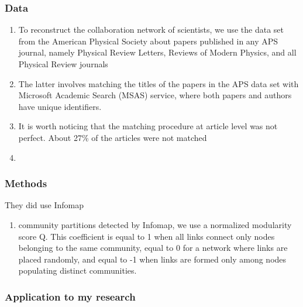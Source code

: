 \documentclass[12pt]{article}
\begin{document}
\subsubsection*{Data}

\begin{enumerate}
    \item To reconstruct the collaboration network of scientists, we use the data set from the American Physical Society about papers published in any APS journal, namely Physical Review Letters, Reviews of Modern Physics, and all Physical Review journals
    \item The latter involves matching the titles of the papers in the APS data set with Microsoft Academic Search (MSAS) service, where both papers and authors have unique identifiers.
    \item It is worth noticing that the matching procedure at article level was not perfect. About 27\% of the articles were not matched
    \item 
\end{enumerate}

\subsubsection*{Methods}

They did use Infomap

\begin{enumerate}
    \item community partitions detected by Infomap, we use a normalized modularity score Q. This coefficient is equal to 1 when all links connect only nodes belonging to the same community, equal to 0 for a network where links are placed randomly, and equal to -1 when links are formed only among nodes populating distinct communities.
\end{enumerate}

\subsubsection*{Application to my research}




\end{document}
